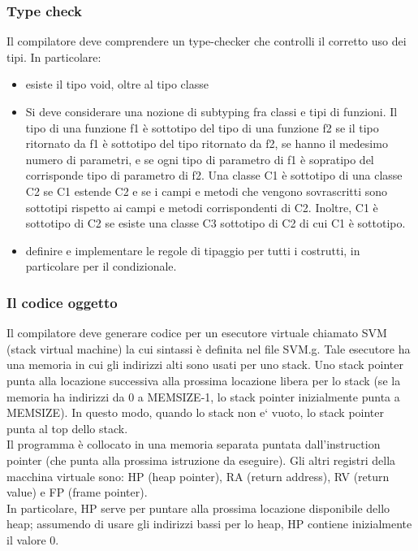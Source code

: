 \documentclass[a4paper]{article}   %
\begin{document}
\subsubsection{Type check}

Il compilatore deve comprendere un type-checker che controlli il corretto uso dei tipi.
In particolare:

\begin{itemize}
  \item esiste il tipo void, oltre al tipo classe

  \item Si deve considerare una nozione di subtyping fra classi e tipi di funzioni. Il tipo
  di una funzione f1 è sottotipo del tipo di una funzione f2 se il tipo ritornato da f1
  è sottotipo del tipo ritornato da f2, se hanno il medesimo numero di parametri, e se
  ogni tipo di parametro di f1 è sopratipo del corrisponde tipo di parametro di f2.
  Una classe C1 è sottotipo di una classe C2 se C1 estende C2 e se i campi e metodi che
  vengono sovrascritti sono sottotipi rispetto ai campi e metodi corrispondenti di C2.
  Inoltre, C1 è sottotipo di C2 se esiste una classe C3 sottotipo di C2 di cui C1 è
  sottotipo.

  \item definire e implementare le regole di tipaggio per tutti i costrutti, in
  particolare per il condizionale.
\end{itemize}

\subsubsection{Il codice oggetto}

Il compilatore deve generare codice per un esecutore virtuale chiamato SVM (stack
virtual machine) la cui sintassi è definita nel file SVM.g. Tale esecutore ha una
memoria in cui gli indirizzi alti sono usati per uno stack. Uno stack pointer punta alla
locazione successiva alla prossima locazione libera per lo stack (se la memoria ha
indirizzi da 0 a MEMSIZE-1, lo stack pointer inizialmente punta a MEMSIZE).
In questo modo, quando lo stack non e` vuoto, lo stack pointer punta al top dello stack.\\

Il programma è collocato in una memoria separata puntata dall’instruction pointer
(che punta alla prossima istruzione da eseguire). Gli altri registri della macchina
virtuale sono: HP (heap pointer), RA (return address), RV (return value) e FP
(frame pointer).\\
In particolare, HP serve per puntare alla prossima locazione disponibile dello
heap; assumendo di usare gli indirizzi bassi per lo heap, HP contiene inizialmente
il valore 0.\\
\end{document}
